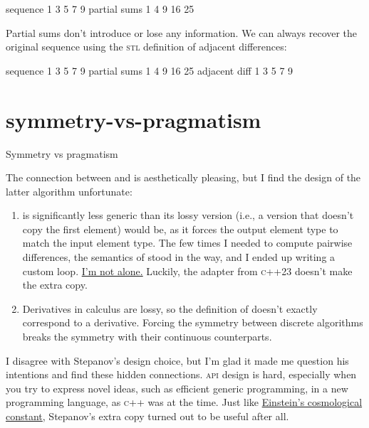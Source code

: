 \documentclass{article}
\begin{document}
\begin{code}
    sequence  1   3   5   7   9
partial sums  1   4   9  16  25
\end{code}

Partial sums don't introduce or lose any information.
We can always recover the original sequence using the \textsc{stl} definition of adjacent differences:

\begin{code}
     sequence  1   3   5   7   9
 partial sums  1   4   9  16  25
adjacent diff  1   3   5   7   9
\end{code}

\section{symmetry-vs-pragmatism}{Symmetry vs pragmatism}

The connection between  and  is aesthetically pleasing,
but I find the design of the latter algorithm unfortunate:

\begin{enumerate}
\item
   is significantly less generic than its lossy version
  (i.e., a version that doesn't copy the first element) would be,
  as it forces the output element type to match the input element type.
  The few times I needed to compute pairwise differences,
  the semantics of  stood in the way,
  and I ended up writing a custom loop.
  \href{https://stackoverflow.com/questions/8267806/implicit-transformation-while-calling-stdadjacent-difference}{I'm not alone.}
  Luckily, the \href{https://en.cppreference.com/w/cpp/ranges/adjacent_transform_view.html}{} adapter from \textsc{c++23} doesn't make the extra copy.

\item
  Derivatives in calculus are lossy,
  so the definition of  doesn't exactly correspond to a derivative.
  Forcing the symmetry between discrete algorithms breaks the symmetry with their continuous counterparts.
\end{enumerate}

I disagree with Stepanov's design choice,
but I'm glad it made me question his intentions and find these hidden connections.
\textsc{api} design is hard,
especially when you try to express novel ideas,
such as efficient generic programming,
in a new programming language,
as \textsc{c++} was at the time.
Just like \href{https://en.wikipedia.org/wiki/Cosmological_constant}{Einstein's cosmological constant},
Stepanov's extra copy turned out to be useful after all.
\end{document}
